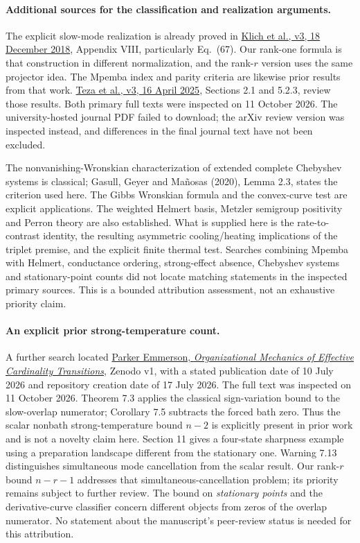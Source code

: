 \documentclass[11pt]{article}
\begin{document}
\paragraph{Additional sources for the classification and realization arguments.}
The explicit slow-mode realization is already proved in \href{https://arxiv.org/abs/1711.05829v3}{Klich et al., v3, 18 December 2018}, Appendix VIII, particularly Eq.~(67). Our rank-one formula is that construction in different normalization, and the rank-$r$ version uses the same projector idea. The Mpemba index and parity criteria are likewise prior results from that work. \href{https://arxiv.org/abs/2502.01758v3}{Teza et al., v3, 16 April 2025}, Sections 2.1 and 5.2.3, review those results. Both primary full texts were inspected on 11 October 2026. The university-hosted journal PDF failed to download; the arXiv review version was inspected instead, and differences in the final journal text have not been excluded.

The nonvanishing-Wronskian characterization of extended complete Chebyshev systems is classical; Gasull, Geyer and Ma\~nosas (2020), Lemma 2.3, states the criterion used here. The Gibbs Wronskian formula and the convex-curve test are explicit applications. The weighted Helmert basis, Metzler semigroup positivity and Perron theory are also established. What is supplied here is the rate-to-contrast identity, the resulting asymmetric cooling/heating implications of the triplet premise, and the explicit finite thermal test. Searches combining Mpemba with Helmert, conductance ordering, strong-effect absence, Chebyshev systems and stationary-point counts did not locate matching statements in the inspected primary sources. This is a bounded attribution assessment, not an exhaustive priority claim.

\paragraph{An explicit prior strong-temperature count.}
A further search located \href{https://doi.org/10.5281/zenodo.21298061}{Parker
Emmerson, \emph{Organizational Mechanics of Effective Cardinality Transitions}},
Zenodo v1, with a stated publication date of 10 July 2026 and repository creation
date of 17 July 2026. The full text was inspected on 11 October 2026.
Theorem 7.3 applies the classical sign-variation bound to the slow-overlap
numerator; Corollary 7.5 subtracts the forced bath zero. Thus the scalar
nonbath strong-temperature bound $n-2$ is explicitly present in prior work
and is not a novelty claim here. Section 11 gives a four-state sharpness example
using a preparation landscape different from the stationary one. Warning 7.13
distinguishes simultaneous mode cancellation from the scalar result.
Our rank-$r$ bound $n-r-1$ addresses that simultaneous-cancellation problem;
its priority remains subject to further review. The bound on \emph{stationary
points} and the derivative-curve classifier concern different objects from
zeros of the overlap numerator. No statement about the manuscript's peer-review
status is needed for this attribution.
\end{document}
